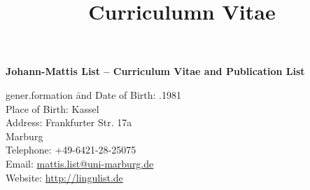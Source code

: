 \documentclass[xetex,11pt,a4paper]{moderncv}
\title{Curriculumn Vitae}
\begin{document}
\pagestyle{plain}


\textbf{Johann-Mattis List -- Curriculum Vitae and Publication List}\\ 
\noindent\begin{tabbing}
    gener.formation \= and \kill
    \footnotesize Date of Birth:                      .1981 \\
    \footnotesize Place of Birth:                      \> Kassel \\
    \footnotesize Address:                         \> Frankfurter Str. 17a \\
    \footnotesize                                  {} Marburg \\
    \footnotesize Telephone:                        \> +49-6421-28-25075 \\
    \footnotesize Email:                           \> \url{mattis.list@uni-marburg.de} \\
    \footnotesize Website:\> \url{http://lingulist.de}\\
\end{tabbing}
\end{document}
